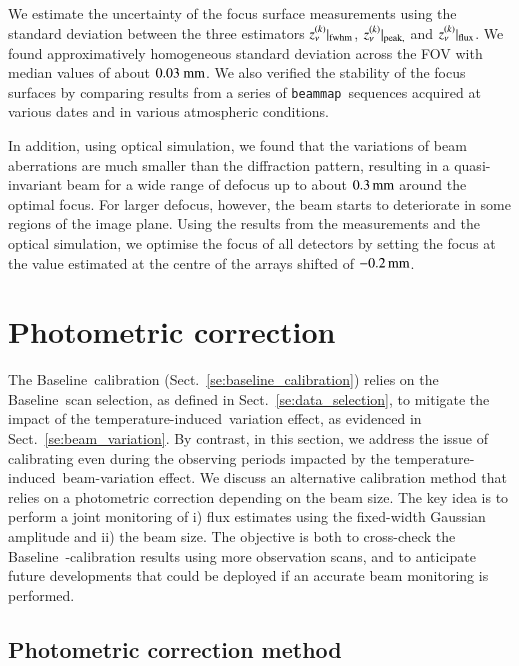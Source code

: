 \documentclass[traditionalabstract]{aa}
\newcommand{\bm}{{\tt beammap}}
\newcommand{\afternoon}{temperature-induced}
\newcommand{\baseline}{Baseline}%
\newcommand{\lp}[1]{#1}
\begin{document}
{\begin{appendix}
We estimate the uncertainty of the focus
surface measurements using the standard deviation between the three
estimators $z_\nu^{(k)}|_{\rm{fwhm}}$, $z_\nu^{(k)}|_{\rm{peak,}}$ and
$z_\nu^{(k)}|_{\rm{flux}}$. We found approximatively homogeneous
standard deviation across the FOV with median values of about
$0.03~\rm{mm}$. We also verified the stability of the focus surfaces by comparing
results from a series of \bm\ sequences acquired at various dates and
in various atmospheric conditions.

{\lp In addition, using optical simulation, we found that the
variations of beam aberrations are much smaller than the
diffraction pattern, resulting in a quasi-invariant beam for a
wide range of defocus up to about $0.3\, \rm{mm}$ around the optimal
focus. For larger defocus, however, the beam starts to deteriorate in
some regions of the image plane.}
{\lp Using the results from the measurements and the optical
simulation, we optimise the focus of all detectors by setting the
focus at the value estimated at the centre of the arrays shifted of
$-0.2\,\rm{mm}$.}


%
%
  \section{Photometric correction}
  \label{se:photometric_correction}
 

The \baseline\ calibration (Sect.~\ref{se:baseline_calibration}) relies on
the \baseline\ scan selection, as defined in
Sect.~\ref{se:data_selection}, to mitigate the impact of
the \afternoon\ variation effect, as evidenced in Sect.~\ref{se:beam_variation}.
By contrast, in this section, we
address the issue of calibrating even during the observing periods
impacted by the \afternoon\ beam-variation effect. We discuss an
alternative calibration method that
relies on a photometric correction depending on the beam size.
{\lp The key idea is to perform a joint monitoring of i) flux estimates
  using the fixed-width Gaussian amplitude and ii) the beam size.}
The objective is both to cross-check the \baseline\ -calibration results
using more observation scans, and to anticipate future developments
that could be deployed if an accurate beam monitoring is performed.


\subsection{Photometric correction method}
\label{se:photometric_correction_method}


\end{appendix}}
\end{document}
